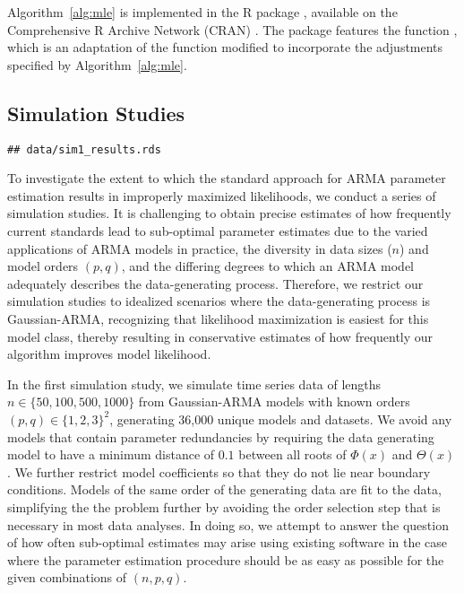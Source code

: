 Algorithm~\ref{alg:mle} is implemented in the R package , available on the Comprehensive R Archive Network (CRAN) \cite{arima2Cran}.
The package features the function , which is an adaptation of the  function modified to incorporate the adjustments specified by Algorithm~\ref{alg:mle}.

\subsection{Simulation Studies}\label{sec:sims}

\begin{knitrout}
\color{fgcolor}\begin{kframe}
\begin{verbatim}
## data/sim1_results.rds
\end{verbatim}
\end{kframe}
\end{knitrout}

To investigate the extent to which the standard approach for ARMA parameter estimation results in improperly maximized likelihoods, we conduct a series of simulation studies.
It is challenging to obtain precise estimates of how frequently current standards lead to sub-optimal parameter estimates due to the varied applications of ARMA models in practice, the diversity in data sizes ($n$) and model orders $(p, q)$, and the differing degrees to which an ARMA model adequately describes the data-generating process.
Therefore, we restrict our simulation studies to idealized scenarios where the data-generating process is Gaussian-ARMA, recognizing that likelihood maximization is easiest for this model class, thereby resulting in conservative estimates of how frequently our algorithm improves model likelihood.

In the first simulation study, we simulate time series data of lengths $n \in \{50, 100, 500, 1000\}$ from Gaussian-ARMA models with known orders $(p, q) \in \{1, 2, 3\}^2$, generating 36,000 unique models and datasets.
We avoid any models that contain parameter redundancies by requiring the data generating model to have a minimum distance of $0.1$ between all roots of $\Phi(x)$ and $\Theta(x)$.
We further restrict model coefficients so that they do not lie near boundary conditions.
Models of the same order of the generating data are fit to the data, simplifying the the problem further by avoiding the order selection step that is necessary in most data analyses.
In doing so, we attempt to answer the question of how often sub-optimal estimates may arise using existing software in the case where the parameter estimation procedure should be as easy as possible for the given combinations of $(n, p, q)$.

